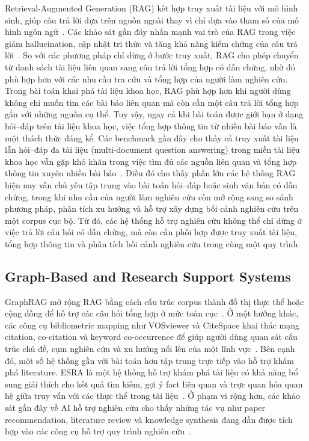 \documentclass[conference]{IEEEtran}
\begin{document}
Retrieval-Augmented Generation (RAG) kết hợp truy xuất tài liệu với mô hình sinh, giúp câu trả lời dựa trên nguồn ngoài thay vì chỉ dựa vào tham số của mô hình ngôn ngữ~\cite{lewis2020retrieval}. Các khảo sát gần đây nhấn mạnh vai trò của RAG trong việc giảm hallucination, cập nhật tri thức và tăng khả năng kiểm chứng của câu trả lời~\cite{gao2023ragSurvey}. So với các phương pháp chỉ dừng ở bước truy xuất, RAG cho phép chuyển từ danh sách tài liệu liên quan sang câu trả lời tổng hợp có dẫn chứng, nhờ đó phù hợp hơn với các nhu cầu tra cứu và tổng hợp của người làm nghiên cứu. Trong bài toán khai phá tài liệu khoa học, RAG phù hợp hơn khi người dùng không chỉ muốn tìm các bài báo liên quan mà còn cần một câu trả lời tổng hợp gắn với những nguồn cụ thể. Tuy vậy, ngay cả khi bài toán được giới hạn ở dạng hỏi--đáp trên tài liệu khoa học, việc tổng hợp thông tin từ nhiều bài báo vẫn là một thách thức đáng kể. Các benchmark gần đây cho thấy cả truy xuất tài liệu lẫn hỏi--đáp đa tài liệu (multi-document question answering) trong miền tài liệu khoa học vẫn gặp khó khăn trong việc tìm đủ các nguồn liên quan và tổng hợp thông tin xuyên nhiều bài báo~\cite{huang2025mdaqa}. Điều đó cho thấy phần lớn các hệ thống RAG hiện nay vẫn chủ yếu tập trung vào bài toán hỏi--đáp hoặc sinh văn bản có dẫn chứng, trong khi nhu cầu của người làm nghiên cứu còn mở rộng sang so sánh phương pháp, phân tích xu hướng và hỗ trợ xây dựng bối cảnh nghiên cứu trên một corpus cục bộ. Từ đó, các hệ thống hỗ trợ nghiên cứu không thể chỉ dừng ở việc trả lời câu hỏi có dẫn chứng, mà còn cần phối hợp được truy xuất tài liệu, tổng hợp thông tin và phân tích bối cảnh nghiên cứu trong cùng một quy trình.

\subsection{Graph-Based and Research Support Systems}

GraphRAG mở rộng RAG bằng cách cấu trúc corpus thành đồ thị thực thể hoặc cộng đồng để hỗ trợ các câu hỏi tổng hợp ở mức toàn cục~\cite{edge2024local}. Ở một hướng khác, các công cụ bibliometric mapping như VOSviewer và CiteSpace khai thác mạng citation, co-citation và keyword co-occurrence để giúp người dùng quan sát cấu trúc chủ đề, cụm nghiên cứu và xu hướng nổi lên của một lĩnh vực~\cite{vosviewerTool2026,citespaceTool2026}. Bên cạnh đó, một số hệ thống gần với bài toán hơn tập trung trực tiếp vào hỗ trợ khám phá literature. ESRA là một hệ thống hỗ trợ khám phá tài liệu có khả năng bổ sung giải thích cho kết quả tìm kiếm, gợi ý fact liên quan và trực quan hóa quan hệ giữa truy vấn với các thực thể trong tài liệu~\cite{hongwimol2021esra}. Ở phạm vi rộng hơn, các khảo sát gần đây về AI hỗ trợ nghiên cứu cho thấy những tác vụ như paper recommendation, literature review và knowledge synthesis đang dần được tích hợp vào các công cụ hỗ trợ quy trình nghiên cứu~\cite{zhou2025aiResearchSurvey}.
\end{document}
